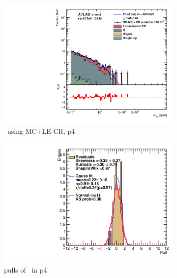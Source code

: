 \newpage

\begin{figure}[ht]
    \centering
    \begin{subfigure}[h]{0.38\linewidth}
    \includegraphics[scale=0.3]{figs/ch6/fit/variable_nosmooth/p4/01PB/output_SMMCplusCR_Mbe_p4.pdf}%
    \caption{\mbe \ using MC+LE-CR, p4}
    \end{subfigure}
    \hfill
    \begin{subfigure}[h]{0.4\linewidth}
    \includegraphics[scale=0.32]{figs/ch6/fit/variable_nosmooth/p4/01PB/pull_SMMCplusCR_Mbe_p4.pdf}%
    \caption{pulls of \mbe \ in p4}
    \end{subfigure}
    \hfill
    \begin{subfigure}[h]{0.38\linewidth}

\end{subfigure}
\end{figure}
